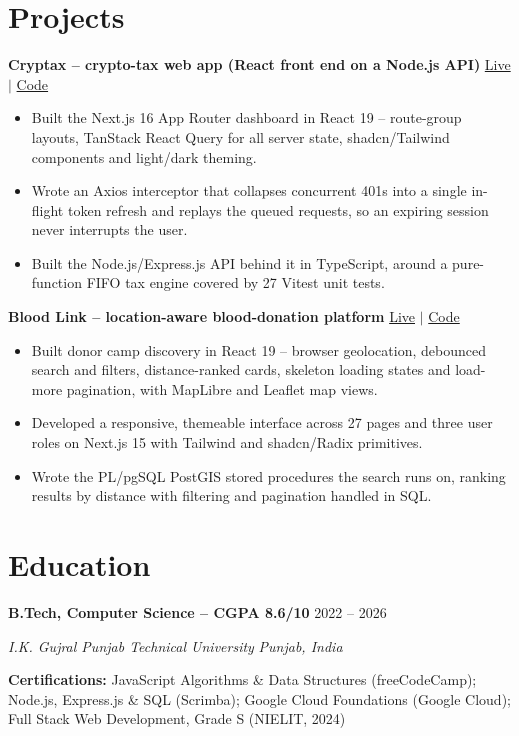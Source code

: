 \documentclass[letterpaper,10.5pt]{article}
\newcommand{\Entry}[4]{%
  \textbf{#1} \hfill {\small #2}\par
  \textit{\small #3} \hfill {\small\textit{#4}}\par\vspace{-1pt}}
\newcommand{\EntryLine}[2]{\textbf{#1} \hfill {\small #2}\par\vspace{-1pt}}
\newenvironment{Bullets}
  {\begin{itemize}[leftmargin=1.15em,itemsep=1.5pt,parsep=0pt,topsep=3pt]\small}
  {\end{itemize}\vspace{3pt}}
\newcommand{\SkillRow}[2]{{\small \textbf{#1:} #2}\par\vspace{1.5pt}}
\begin{document}
\section{Projects}
\EntryLine{Cryptax -- crypto-tax web app (React front end on a Node.js API)}{\href{https://cryp1ax.vercel.app}{Live} $|$ \href{https://github.com/Agent-Gautam/buddy-backend}{Code}}
\begin{Bullets}
  \item Built the Next.js 16 App Router dashboard in React 19 -- route-group layouts, TanStack React Query for all server state, shadcn/Tailwind components and light/dark theming.
  \item Wrote an Axios interceptor that collapses concurrent 401s into a single in-flight token refresh and replays the queued requests, so an expiring session never interrupts the user.
  \item Built the Node.js/Express.js API behind it in TypeScript, around a pure-function FIFO tax engine covered by 27 Vitest unit tests.
\end{Bullets}

\EntryLine{Blood Link -- location-aware blood-donation platform}{\href{https://blood-link2.vercel.app}{Live} $|$ \href{https://github.com/Agent-Gautam/blood-link-supabase}{Code}}
\begin{Bullets}
  \item Built donor camp discovery in React 19 -- browser geolocation, debounced search and filters, distance-ranked cards, skeleton loading states and load-more pagination, with MapLibre and Leaflet map views.
  \item Developed a responsive, themeable interface across 27 pages and three user roles on Next.js 15 with Tailwind and shadcn/Radix primitives.
  \item Wrote the PL/pgSQL PostGIS stored procedures the search runs on, ranking results by distance with filtering and pagination handled in SQL.
\end{Bullets}

\section{Education}
\Entry{B.Tech, Computer Science -- CGPA 8.6/10}{2022 -- 2026}{I.K. Gujral Punjab Technical University}{Punjab, India}
\vspace{2pt}
\SkillRow{Certifications}{JavaScript Algorithms \& Data Structures (freeCodeCamp); Node.js, Express.js \& SQL (Scrimba); Google Cloud Foundations (Google Cloud); Full Stack Web Development, Grade S (NIELIT, 2024)}
\end{document}
